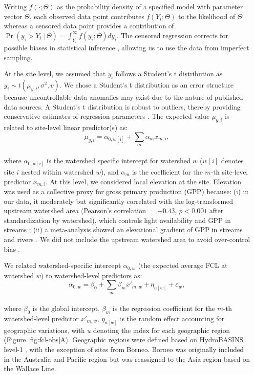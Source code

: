 \documentclass[9pt,twocolumn,twoside]{pnas-new}
\begin{document}
Writing $f(\cdot;\Theta)$ as the probability density of a specified model with parameter vector $\Theta$, each observed data point contributes $f(Y_i;\Theta)$ to the likelihood of $\Theta$ whereas a censored data point provides a contribution of $\Pr(y_i > Y_i~|~\Theta) = \int_{Y_i}^{\infty} f(y_i;\Theta) dy_i$.
The censored regression corrects for possible biases in statistical inference \citep{terui_stream_2018, lunn_bugs_2012}, allowing us to use the data from imperfect sampling.

At the site level, we assumed that $y_i$ follows a Student's t distribution as $y_i \sim t(\mu_{y,i}, \sigma^2, v)$.
We chose a Student's t distribution as an error structure because uncontrollable data anomalies may exist due to the nature of published data sources.
A Student's t distribution is robust to outliers, thereby providing conservative estimates of regression parameters \citep{lunn_bugs_2012}.
The expected value $\mu_{y,i}$ is related to site-level linear predictor(s) as:
\\
\begin{equation}
    \mu_{y,i} = \alpha_{0, w[i]} + \sum_m \alpha_m x_{m,i},
\end{equation}
\\
where $\alpha_{0, w[i]}$ is the watershed specific intercept for watershed $w$ ($w[i]$ denotes site $i$ nested within watershed $w$), and $\alpha_m$ is the coefficient for the $m$-th site-level predictor $x_{m, i}$.
At this level, we considered local elevation at the site. 
Elevation was used as a collective proxy for gross primary production (GPP) because: (i) in our data, it moderately but significantly correlated with the log-transformed upstream watershed area (Pearson's correlation $= -0.43$, $p < 0.001$ after standardization by watershed), which controls light availability and GPP in streams \citep{finlay_light-mediated_2011, finlay_stream_2011, bernhardt_light_2022}; (ii) a meta-analysis showed an elevational gradient of GPP in streams and rivers \citep{marzolf_ecosystem_2021}.
We did not include the upstream watershed area to avoid over-control bias \citep{arif_predictive_2022}.

We related watershed-specific intercept $\alpha_{0, w}$ (the expected average FCL at watershed $w$) to watershed-level predictors as:
\\
\begin{equation}
    \alpha_{0, w} = \beta_0 + \sum_m \beta_m x'_{m, w} + \eta_{u[w]} + \varepsilon_{w},
    \label{eq:watershed-avarage}
\end{equation}
\\
where $\beta_0$ is the global intercept, $\beta_m$ is the regression coefficient for the $m$-th watershed-level predictor $x'_{m, w}$, $\eta_{u[w]}$ is the random effect accounting for geographic variations, with $u$ denoting the index for each geographic region (Figure \ref{fig:fcl-obs}A).
Geographic regions were defined based on HydroBASINS level-1 \citep{lehner_global_2013}, with the exception of sites from Borneo. 
Borneo was originally included in the Australia and Pacific region but was reassigned to the Asia region based on the Wallace Line.
\end{document}
